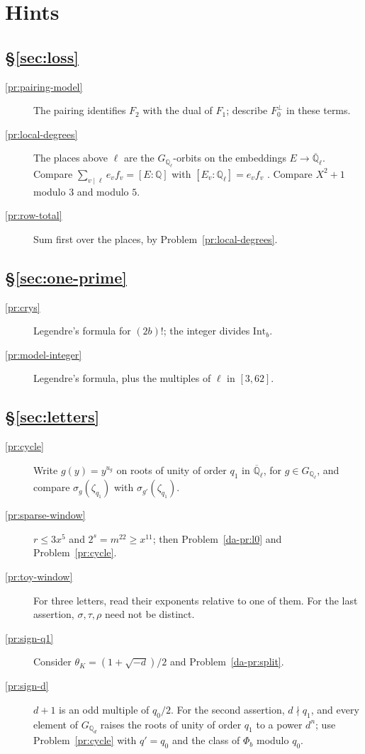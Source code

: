 \documentclass[reqno]{amsart}
\theoremstyle{definition}
\theoremstyle{plain}
\newcommand{\Q}{\mathbb{Q}}
\newcommand{\Int}{\mathrm{Int}}
\newcommand{\Gl}{G_{\Q_\ell}}
\begin{document}
\section*{Hints}

\subsection*{\S\ref{sec:loss}}
\begin{description}
\item[\ref{pr:pairing-model}] The pairing identifies \(F_2\) with the dual of \(F_1\); describe \(F_0^\perp\) in these terms.
\item[\ref{pr:local-degrees}] The places above \(\ell\) are the \(\Gl\)-orbits on the embeddings \(E\to\overline{\Q}_\ell\).  Compare \(\sum_{v\mid\ell}e_vf_v=[E:\Q]\) \cite[Ch.~I, \S4, Prop.~10]{SLF} with \([E_v:\Q_\ell]=e_vf_v\) \cite[Ch.~II, \S2, Cor.~1 to Prop.~3]{SLF}.  Compare \(X^2+1\) modulo \(3\) and modulo \(5\).
\item[\ref{pr:row-total}] Sum first over the places, by Problem~\ref{pr:local-degrees}.
\end{description}

\subsection*{\S\ref{sec:one-prime}}
\begin{description}
\item[\ref{pr:crys}] Legendre's formula for \((2b)!\); the integer divides \(\Int_b\).
\item[\ref{pr:model-integer}] Legendre's formula, plus the multiples of \(\ell\) in \([3, 62]\).
\end{description}

\subsection*{\S\ref{sec:letters}}
\begin{description}
\item[\ref{pr:cycle}] Write \(g(y) = y^{u_g}\) on roots of unity of order \(q_1\) in \(\overline{\Q}_\ell\), for \(g \in \Gl\), and compare \(\sigma_g(\zeta_{q_1})\) with \(\sigma_{g'}(\zeta_{q_1})\).
\item[\ref{pr:sparse-window}] \(r \le 3x^5\) and \(2^s = m^{22} \ge x^{11}\); then Problem~\ref{da-pr:l0} and Problem~\ref{pr:cycle}.
\item[\ref{pr:toy-window}] For three letters, read their exponents relative to one of them.  For the last assertion, \(\sigma, \tau, \rho\) need not be distinct.
\item[\ref{pr:sign-q1}] Consider \(\theta_K = (1 + \sqrt{-d})/2\) and Problem~\ref{da-pr:split}.
\item[\ref{pr:sign-d}] \(d + 1\) is an odd multiple of \(q_0/2\).  For the second assertion, \(d \nmid q_1\), and every element of \(G_{\Q_d}\) raises the roots of unity of order \(q_1\) to a power \(d^n\); use Problem~\ref{pr:cycle} with \(q' = q_0\) and the class of \(\Phi_b\) modulo \(q_0\).
\end{description}
\end{document}
